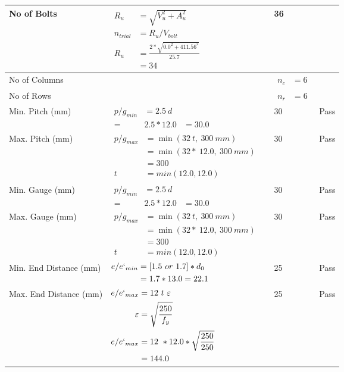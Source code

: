 \documentclass{article}%
\begin{document}
\begin{longtable}{|p{3cm}|p{5.5cm}|p{6cm}|p{1.5cm}|}
\hline%
No of Bolts&$\begin{aligned}R_{u} &= \sqrt{V_u^2+A_u^2}\\ n_{trial} &= R_u/ V_{bolt}\\ R_{u} &= \frac{2*\sqrt{0.0^2+411.56^2}}{25.7}\\ &=34\end{aligned}$&36&\\%
\hline%
No of Columns&&$\begin{aligned} n_c &=6\end{aligned}$&\\%
\hline%
No of Rows&&$\begin{aligned} n_r &=6\end{aligned}$&\\%
\hline%
Min. Pitch (mm)&$\begin{aligned}p/g_{min}&= 2.5 ~ d&\\ =&2.5*12.0&=30.0\end{aligned}$&30&Pass\\%
\hline%
Max. Pitch (mm)&$\begin{aligned}p/g_{max} &=\min(32~t,~300~mm)&\\ &=\min(32 *~12.0,~ 300 ~mm)\\&=300\\  t& = min(12.0,12.0)\end{aligned}$&30&Pass\\%
\hline%
Min. Gauge (mm)&$\begin{aligned}p/g_{min}&= 2.5 ~ d&\\ =&2.5*12.0&=30.0\end{aligned}$&30&Pass\\%
\hline%
Max. Gauge (mm)&$\begin{aligned}p/g_{max} &=\min(32~t,~300~mm)&\\ &=\min(32 *~12.0,~ 300 ~mm)\\&=300\\  t& = min(12.0,12.0)\end{aligned}$&30&Pass\\%
\hline%
Min. End Distance (mm)&$\begin{aligned}e/e`_{min} &=[1.5~or~ 1.7] * d_0\\ &=1.7*13.0=22.1 \end{aligned}$&25&Pass\\%
\hline%
Max. End Distance (mm)&$\begin{aligned}e/e`_{max} &= 12~ t~ \varepsilon&\\ \varepsilon &= \sqrt{\frac{250}{f_y}}\\ e/e`_{max}&=12 ~*12.0*\sqrt{\frac{250}{250}}\\ &=144.0\\ \end{aligned}$&25&Pass\\%

\end{longtable}
\end{document}
